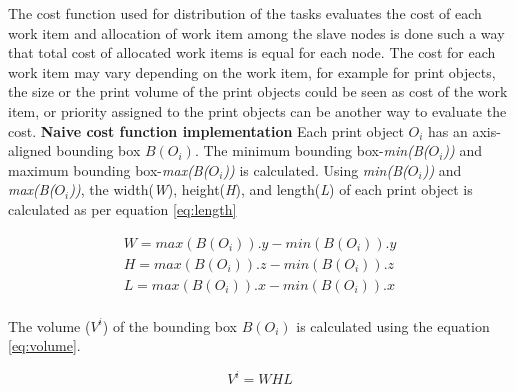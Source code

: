 The cost function used for distribution of the tasks evaluates the cost of each work item and allocation of work item among the slave nodes is done such a way that total cost of allocated work items is equal for each node. The cost for each work item may vary depending on the work item, for example for print objects, the size or the print volume of the print objects could be seen as cost of the work item, or priority assigned to the print objects can be another way to evaluate the cost. 
\newline
\textbf{Naive cost function implementation }\newline
Each print object \textit{\begin{math}O_{i}\end{math}} has an axis-aligned bounding box \textit{\begin{math} B(O_{i}) \end{math}}. The minimum bounding box-\textit{min(B(\begin{math}O_{i}\end{math}))} and maximum bounding box-\textit{max(B(\begin{math}O_{i}\end{math}))} is calculated. Using \textit{min(B(\begin{math}O_{i}\end{math}))} and \textit{max(B(\begin{math}O_{i}\end{math}))}, the width(\textit{W}), height(\textit{H}), and length(\textit{L}) of each print object is calculated as per equation \ref{eq:length}

\begin{equation}
\label{eq:length}
\begin{aligned}
W= max(B(O_{i})).y-min(B(O_{i})).y \\
H= max(B(O_{i})).z-min(B(O_{i})).z \\
L= max(B(O_{i})).x-min(B(O_{i})).x \\
\end{aligned}
\end{equation}

The volume (\begin{math}V^i\end{math}) of the bounding box \begin{math}B(O_{i})\end{math} is calculated using the equation \ref{eq:volume}.

\begin{equation}
\label{eq:volume}
V^i= WHL
\end{equation}

